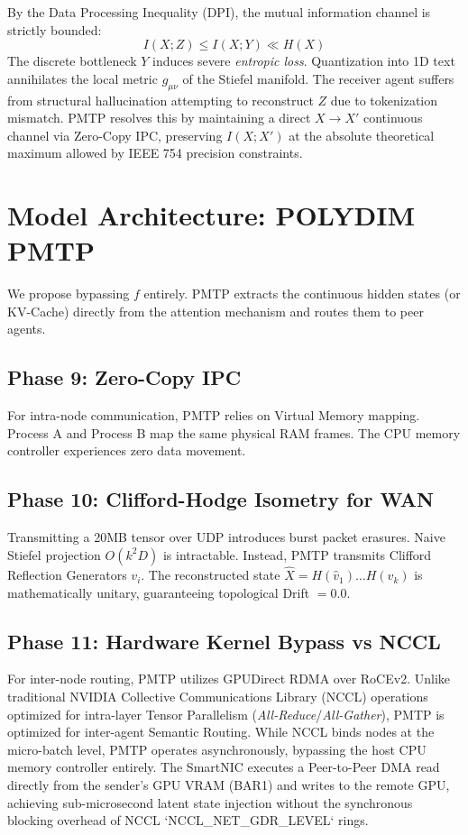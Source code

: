 \documentclass[11pt, a4paper]{article}
\begin{document}
By the Data Processing Inequality (DPI), the mutual information channel is strictly bounded:
\begin{equation}
I(X; Z) \le I(X; Y) \ll H(X)
\end{equation}
The discrete bottleneck $Y$ induces severe \textit{entropic loss}. Quantization into 1D text annihilates the local metric $g_{\mu\nu}$ of the Stiefel manifold. The receiver agent suffers from structural hallucination attempting to reconstruct $Z$ due to tokenization mismatch. PMTP resolves this by maintaining a direct $X \to X'$ continuous channel via Zero-Copy IPC, preserving $I(X; X')$ at the absolute theoretical maximum allowed by IEEE 754 precision constraints.

\section{Model Architecture: POLYDIM PMTP}
We propose bypassing $f$ entirely. PMTP extracts the continuous hidden states (or KV-Cache) directly from the attention mechanism and routes them to peer agents.

\subsection{Phase 9: Zero-Copy IPC}
For intra-node communication, PMTP relies on Virtual Memory mapping. Process A and Process B map the same physical RAM frames. The CPU memory controller experiences zero data movement.

\subsection{Phase 10: Clifford-Hodge Isometry for WAN}
Transmitting a 20MB tensor over UDP introduces burst packet erasures. Naive Stiefel projection $O(k^2 D)$ is intractable. Instead, PMTP transmits Clifford Reflection Generators $v_i$. The reconstructed state $\hat{X} = H(\hat{v}_1) \dots H(\hat{v}_k)$ is mathematically unitary, guaranteeing topological Drift $= 0.0$.

\subsection{Phase 11: Hardware Kernel Bypass vs NCCL}
For inter-node routing, PMTP utilizes GPUDirect RDMA over RoCEv2. Unlike traditional NVIDIA Collective Communications Library (NCCL) operations optimized for intra-layer Tensor Parallelism (\textit{All-Reduce}/\textit{All-Gather}), PMTP is optimized for inter-agent Semantic Routing. While NCCL binds nodes at the micro-batch level, PMTP operates asynchronously, bypassing the host CPU memory controller entirely. The SmartNIC executes a Peer-to-Peer DMA read directly from the sender's GPU VRAM (BAR1) and writes to the remote GPU, achieving sub-microsecond latent state injection without the synchronous blocking overhead of NCCL `NCCL\_NET\_GDR\_LEVEL` rings.
\end{document}

